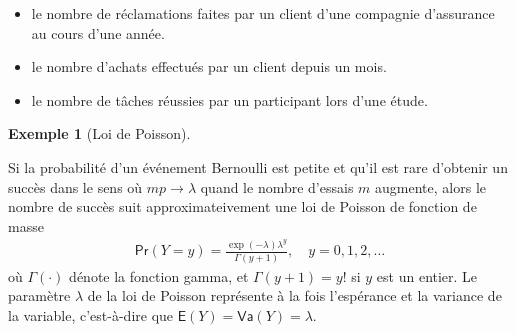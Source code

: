 \documentclass[
  11pt,
  letterpaper,
]{scrbook}
\providecommand{\tightlist}{%
  \setlength{\itemsep}{0pt}\setlength{\parskip}{0pt}}\usepackage{longtable,booktabs,array}
\theoremstyle{plain}
\theoremstyle{plain}
\theoremstyle{definition}
\newtheorem{example}{Exemple}[chapter]
\theoremstyle{definition}
\theoremstyle{remark}
\begin{document}
\begin{itemize}
\tightlist
\item
  le nombre de réclamations faites par un client d'une compagnie
  d'assurance au cours d'une année.
\item
  le nombre d'achats effectués par un client depuis un mois.
\item
  le nombre de tâches réussies par un participant lors d'une étude.
\end{itemize}

\begin{example}[Loi de
Poisson]\protect\hypertarget{exm-loipoisson}{}\label{exm-loipoisson}

Si la probabilité d'un événement Bernoulli est petite et qu'il est rare
d'obtenir un succès dans le sens où \(mp \to \lambda\) quand le nombre
d'essais \(m\) augmente, alors le nombre de succès suit
approximateivement une loi de Poisson de fonction de masse
\begin{align*}
\mathsf{Pr}(Y=y) = \frac{\exp(-\lambda)\lambda^y}{\Gamma(y+1)}, \quad y=0, 1, 2, \ldots
\end{align*} où \(\Gamma(\cdot)\) dénote la fonction gamma, et
\(\Gamma(y+1) = y!\) si \(y\) est un entier. Le paramètre \(\lambda\) de
la loi de Poisson représente à la fois l'espérance et la variance de la
variable, c'est-à-dire que \(\mathsf{E}(Y)=\mathsf{Va}(Y)=\lambda.\)

\end{example}
\end{document}

